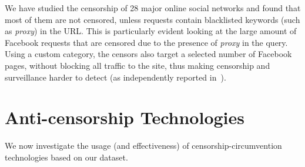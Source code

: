 \documentclass{sig-alternate-2013}
\newcommand{\descr}[1]{\smallskip\noindent{\bf #1}}
\def\df{$D_{full}$\xspace}
\begin{document}
\begin{table}[t!]
\centering
{}
\caption{Top-10 Facebook social plugin elements in \df (fraction of Facebook  traffic and number of requests).}
\label{tab:facebook_plugins}
\end{table}


\descr{Summary.} We have studied the censorship of 28 major online social networks
and found that most of them are not censored, unless requests
contain blacklisted keywords (such as {\em proxy}) in the URL. This is particularly
evident looking at the large amount of Facebook requests that are censored 
due to the presence of {\em proxy} in the query. Using a custom category, the censors also target a selected number of Facebook pages, without blocking all traffic to the site, thus making censorship and surveillance harder to detect (as independently reported in~\cite{oni}). 



\section{Anti-censorship Technologies}\label{sec:anti}
We now investigate the usage (and effectiveness) of censorship-circumvention technologies  based on our dataset. 
\end{document}
